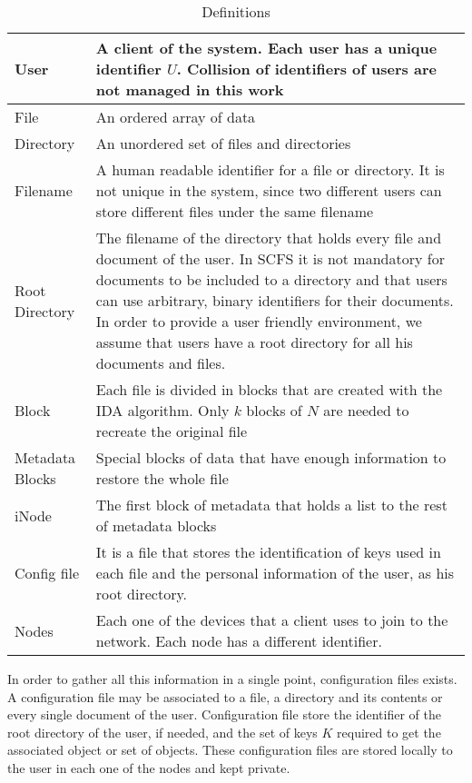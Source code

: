 \documentclass{llncs}
\begin{document}
\begin{table}[t]%
\centering%
\begin{tabular}{lp{}}
\\\hline
User &  A client of the system. Each user has a unique identifier $U$. Collision of identifiers of users are not managed in this work \\\hline
File & An ordered array of data \\\hline
Directory & An unordered set of files and directories \\\hline
Filename & A human readable identifier for a file or directory. It is not unique in the system, since two different users can store different files under the same filename \\\hline
Root Directory & The filename of the directory that holds every file and document of the user. In SCFS it is not mandatory for documents to be included to a directory and that users can use arbitrary, binary identifiers for their documents. In order to provide a user friendly environment, we assume that users have a root directory for all his documents and files. \\\hline
Block & Each file is divided in blocks that are created with the IDA algorithm. Only $k$ blocks of $N$ are needed to recreate the original file \\\hline
Metadata Blocks & Special blocks of data that have enough information to restore the whole file \\\hline
iNode & The first block of metadata that holds a list to the rest of metadata blocks \\\hline
Config file & It is a file that stores the identification of keys used in each file and the personal information of the user, as his root directory. \\\hline
Nodes & Each one of the devices that a client uses to join to the network. Each node has a different identifier. \\\hline
\end{tabular}

\caption{Definitions}
\label{tab:definitions}
\end{table}

In order to gather all this information in a single point, configuration files
exists. A configuration file may be
associated to a file, a directory and its contents or every single document of the
user. Configuration file store the identifier of the root directory of the user, if
needed, and the set of keys $K$ required
to get the associated object or set of objects. These configuration files are
stored locally to the user in each one of the nodes and kept
private.
\end{document}
